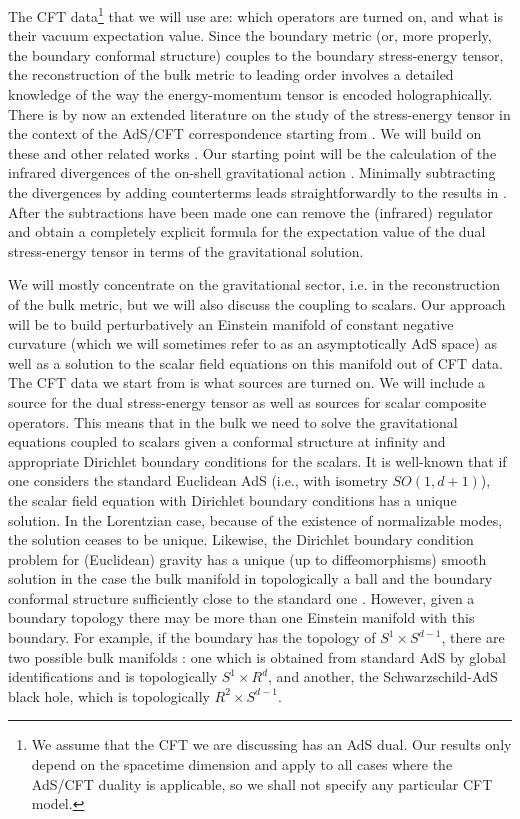The CFT data\footnote{We assume that the 
CFT we are discussing has an AdS dual.
Our results only depend on the spacetime 
dimension and apply to all cases where the AdS/CFT duality 
is applicable, so we shall not specify any particular
CFT model.} that we will use are: which 
operators are turned on, and what is their vacuum 
expectation value. Since the boundary metric (or, more properly,
the boundary conformal structure) couples to the boundary 
stress-energy tensor, the reconstruction of the 
bulk metric to leading order involves a detailed
knowledge of the way the energy-momentum  tensor 
is encoded holographically. 
There is by now an extended literature on the 
study of the stress-energy tensor in the context of the 
AdS/CFT correspondence starting from \cite{BK,Myers}.
We will build on these and other related works \cite{EJM,Mann,KLS}. 
Our starting point will be the calculation of the 
infrared divergences of the on-shell gravitational action
\cite{HS}. Minimally subtracting the divergences 
by adding counterterms \cite{HS} leads straightforwardly to the 
results in \cite{BK,EJM,KLS}. After the subtractions 
have been made one can remove the (infrared) regulator
and obtain a completely explicit formula for
the expectation value of the dual 
stress-energy tensor in terms of the gravitational solution.

We will mostly concentrate on the gravitational sector,
i.e. in the reconstruction of the bulk metric, 
but we will also discuss the coupling to scalars. 
Our approach will be to build perturbatively an Einstein manifold 
of constant negative curvature (which we will sometimes 
refer to as an asymptotically 
AdS space) as well as a solution to the scalar field equations
on this manifold out of CFT data. The CFT data we start from 
is what sources are turned on. We will include 
a source for the dual stress-energy tensor as well 
as sources for scalar composite operators. 
This means that in the bulk we need to solve the 
gravitational equations coupled to scalars 
given a conformal structure at infinity and 
appropriate Dirichlet boundary conditions for the 
scalars. It is well-known that if one considers the standard Euclidean AdS 
(i.e., with isometry $SO(1,d+1)$), the scalar field
equation with Dirichlet boundary conditions 
has a unique solution. In the Lorentzian case,
because of the existence of normalizable modes, the 
solution ceases to be unique. Likewise,
the Dirichlet boundary condition problem 
for (Euclidean) gravity has a unique (up to diffeomorphisms)
smooth solution in the case the bulk manifold in 
topologically a ball and the boundary conformal 
structure sufficiently close to the standard one \cite{GrahamLee}.
However, given a boundary topology there may be 
more than one Einstein manifold with this boundary. 
For example, if the boundary has the topology
of $S^1 \times S^{d-1}$, there are two possible bulk manifolds
\cite{PageH,Wit}:
one which is obtained from standard AdS by global identifications
and is topologically $S^1 \times R^d$,
and another, the Schwarzschild-AdS black hole, 
which is topologically $R^2 \times S^{d-1}$.

